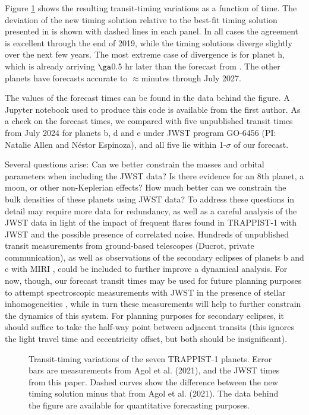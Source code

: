 \documentclass[modern]{aastex631}
\begin{document}
Figure \ref{fig:T1_JWST} shows the resulting transit-timing variations
as a function of time.  %
The deviation of the new timing solution relative to the best-fit timing solution
presented in \citet{Agol2021a} is shown with dashed lines in each panel.
In all cases the agreement is excellent through the end of 2019, while
the timing solutions diverge slightly over the next few years.  The
most extreme case of divergence is for planet h, which is already
arriving $\ga$0.5 hr later than the forecast from \citet{Agol2021a}.  The
other planets have forecasts accurate to $\approx$minutes through July 2027.

The values of the forecast times can be found in the data behind the figure.
A Jupyter notebook used to produce this code is available from the first author.  As a check on the forecast times, we compared with five unpublished transit times from July 2024 for planets b, d and e under JWST program GO-6456 (PI: Natalie Allen and Néstor Espinoza), and all five lie within 1-$\sigma$ of our forecast.

Several questions arise: Can we better constrain the masses and
orbital parameters when including the JWST data?  Is there evidence
for an 8th planet, a moon, or other non-Keplerian effects?  How
much better can we constrain the bulk densities of these planets using JWST data?
To address these questions in detail may require more data for redundancy,
as well as a careful analysis of the JWST data in light of the
impact of frequent flares found in TRAPPIST-1 with JWST \citep{Howard2023}
and the possible presence of correlated noise.  Hundreds
of unpublished transit measurements from ground-based telescopes (Ducrot, private
communication), as well as observations of the secondary eclipses
of planets b and c with MIRI \citep{Greene2023,Zieba2023}, could be included to further improve a dynamical analysis.  For now, though, our forecast transit
times may be used for future planning purposes to attempt spectroscopic
measurements with JWST in the presence of stellar inhomogeneities \citep{Lim2023,deWit2024},
while in turn these measurements will help to further constrain the
dynamics of this system.  For planning purposes for secondary
eclipses, it should suffice to take the half-way point between
adjacent transits (this ignores the light travel time and
eccentricity offset, but both should be insignificant).


\begin{figure}[ht!]

\caption{Transit-timing variations of the seven TRAPPIST-1 planets.  Error bars are measurements from Agol et al. (2021), and the JWST times from this paper.  Dashed curves show the difference between the new timing solution minus that from Agol et al. (2021).  The data behind the figure are available for quantitative forecasting purposes.
\label{fig:T1_JWST}}
\end{figure}
\end{document}
